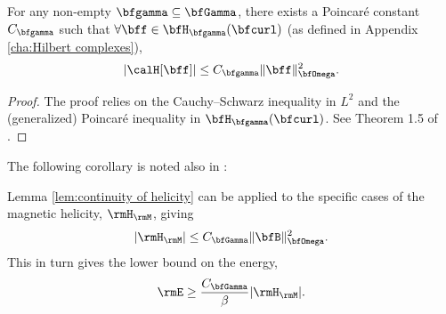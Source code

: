     \line

    \begin{lemma}\label{lem:continuity of helicity}
        For any non-empty $\bfgamma  \subseteq  \bfGamma$, there exists a Poincaré constant $C_{\bfgamma}$ such that $\forall  \bff  \in  \bfH_{\bfgamma}(\bfcurl)$ (as defined in Appendix \ref{cha:Hilbert complexes}),
        \begin{equation}
            |\calH[\bff]|  \leq  C_{\bfgamma}\|\bff\|_{\bfOmega}^{2}.
        \end{equation}
    \end{lemma}
    \begin{proof}
        The proof relies on the Cauchy--Schwarz inequality in $L^{2}$ and the (generalized) Poincaré inequality in $\bfH_{\bfgamma}(\bfcurl)$. See Theorem 1.5 of \cite{Arnold_Khesin_2008}.
    \end{proof}

    The following corollary is noted also in \cite{Arnold_Khesin_2008}:

    \begin{corollary}
        Lemma \ref{lem:continuity of helicity} can be applied to the specific cases of the magnetic helicity, $\rmH_{\rmM}$, giving
        \begin{equation}
            |\rmH_{\rmM}|  \leq  C_{\bfGamma}\|\bfB\|_{\bfOmega}^{2}.
        \end{equation}
        This in turn gives the lower bound on the energy,
        \begin{equation}
            \rmE  \geq  \frac{C_{\bfGamma}}{\beta}|\rmH_{\rmM}|.
        \end{equation}
    \end{corollary}
